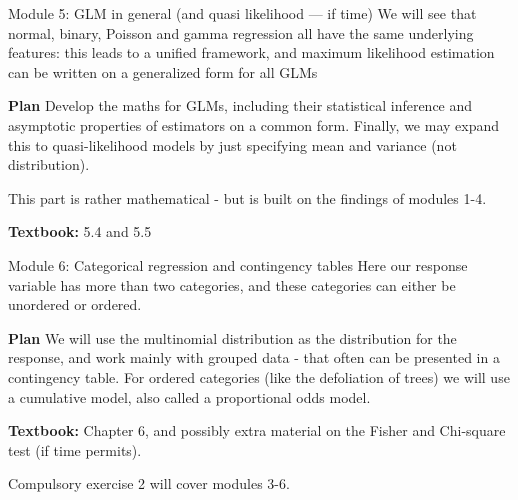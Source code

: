 \documentclass[
  ignorenonframetext,
]{beamer}
\begin{document}
\begin{frame}
\begin{block}{Module 5: GLM in general (and quasi likelihood --- if
time)}
\label{module-5-glm-in-general-and-quasi-likelihood-if-time}
We will see that normal, binary, Poisson and gamma regression all have
the same underlying features: this leads to a unified framework, and
maximum likelihood estimation can be written on a generalized form for
all GLMs

\textbf{Plan} Develop the maths for GLMs, including their statistical
inference and asymptotic properties of estimators on a common form.
Finally, we may expand this to quasi-likelihood models by just
specifying mean and variance (not distribution).

This part is rather mathematical - but is built on the findings of
modules 1-4.

\textbf{Textbook:} 5.4 and 5.5
\end{block}
\end{frame}

\begin{frame}
\begin{block}{Module 6: Categorical regression and contingency tables}
\label{module-6-categorical-regression-and-contingency-tables}
Here our response variable has more than two categories, and these
categories can either be unordered or ordered.

\textbf{Plan} We will use the multinomial distribution as the
distribution for the response, and work mainly with grouped data - that
often can be presented in a contingency table. For ordered categories
(like the defoliation of trees) we will use a cumulative model, also
called a proportional odds model.

\textbf{Textbook:} Chapter 6, and possibly extra material on the Fisher
and Chi-square test (if time permits).

Compulsory exercise 2 will cover modules 3-6.
\end{block}
\end{frame}
\end{document}
